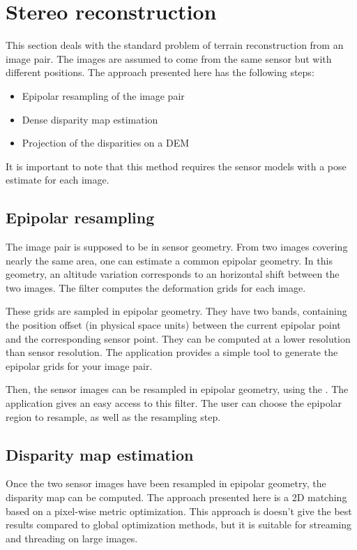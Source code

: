 \section{Stereo reconstruction}
\ifitkFullVersion
\label{sec:StereoReconstruction}
\fi

This section deals with the standard problem of terrain reconstruction 
from an image pair. The images are assumed to come from the same sensor 
but with different positions. The approach presented here has the 
following steps:
\begin{itemize}
\item Epipolar resampling of the image pair
\item Dense disparity map estimation
\item Projection of the disparities on a DEM
\end{itemize}
It is important to note that this method requires the sensor models with
a pose estimate for each image.

\subsection{Epipolar resampling}
The image pair is supposed to be in sensor geometry. From two images covering
nearly the same area, one can estimate a common epipolar geometry. In this geometry, 
an altitude variation corresponds to an horizontal shift between the two images.
The filter  computes the 
deformation grids for each image.

These grids are sampled in epipolar geometry. They have two bands, containing the 
position offset (in physical space units) between the current epipolar point and the 
corresponding sensor point. They can be computed at a lower resolution than sensor
resolution. The application  provides a 
simple tool to generate the epipolar grids for your image pair.

Then, the sensor images can be resampled in epipolar geometry, using the 
. The application 
 gives an easy access to this filter. The user
can choose the epipolar region to resample, as well as the resampling step.

\subsection{Disparity map estimation}
Once the two sensor images have been resampled in epipolar geometry, the 
disparity map can be computed. The approach presented here is a 2D matching 
based on a pixel-wise metric optimization. This approach is doesn't give the best 
results compared to global optimization methods, but it is suitable for 
streaming and threading on large images. 

